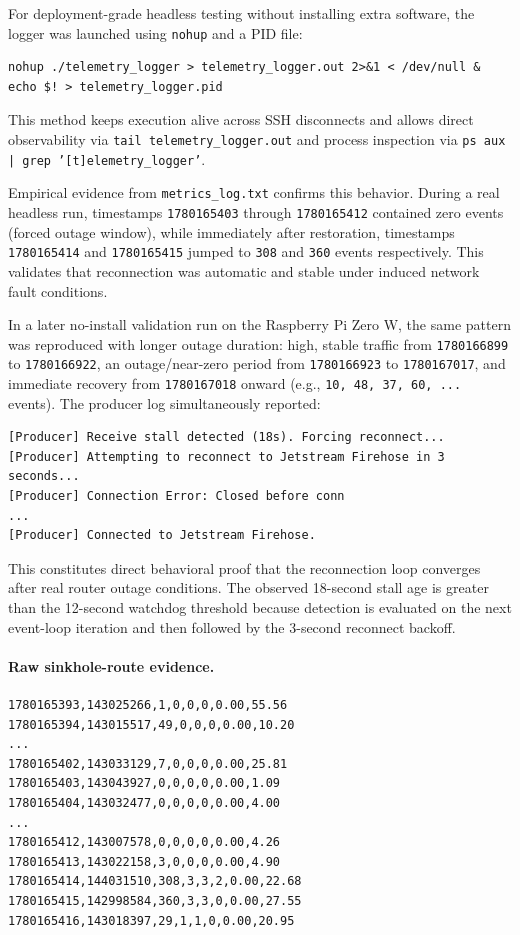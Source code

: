 \documentclass[12pt,a4paper]{article}
\begin{document}
For deployment-grade headless testing without installing extra software, the logger was launched using \texttt{nohup} and a PID file:
\begin{verbatim}
nohup ./telemetry_logger > telemetry_logger.out 2>&1 < /dev/null &
echo $! > telemetry_logger.pid
\end{verbatim}
This method keeps execution alive across SSH disconnects and allows direct observability via \texttt{tail telemetry\_logger.out} and process inspection via \texttt{ps aux | grep '[t]elemetry\_logger'}.

Empirical evidence from \texttt{metrics\_log.txt} confirms this behavior. During a real headless run, timestamps \texttt{1780165403} through \texttt{1780165412} contained zero events (forced outage window), while immediately after restoration, timestamps \texttt{1780165414} and \texttt{1780165415} jumped to \texttt{308} and \texttt{360} events respectively. This validates that reconnection was automatic and stable under induced network fault conditions.

In a later no-install validation run on the Raspberry Pi Zero W, the same pattern was reproduced with longer outage duration: high, stable traffic from \texttt{1780166899} to \texttt{1780166922}, an outage/near-zero period from \texttt{1780166923} to \texttt{1780167017}, and immediate recovery from \texttt{1780167018} onward (e.g., \texttt{10, 48, 37, 60, ...} events). The producer log simultaneously reported:
\begin{verbatim}
[Producer] Receive stall detected (18s). Forcing reconnect...
[Producer] Attempting to reconnect to Jetstream Firehose in 3 seconds...
[Producer] Connection Error: Closed before conn
...
[Producer] Connected to Jetstream Firehose.
\end{verbatim}
This constitutes direct behavioral proof that the reconnection loop converges after real router outage conditions. The observed 18-second stall age is greater than the 12-second watchdog threshold because detection is evaluated on the next event-loop iteration and then followed by the 3-second reconnect backoff.

\paragraph{Raw sinkhole-route evidence.}
\begin{verbatim}
1780165393,143025266,1,0,0,0,0.00,55.56
1780165394,143015517,49,0,0,0,0.00,10.20
...
1780165402,143033129,7,0,0,0,0.00,25.81
1780165403,143043927,0,0,0,0,0.00,1.09
1780165404,143032477,0,0,0,0,0.00,4.00
...
1780165412,143007578,0,0,0,0,0.00,4.26
1780165413,143022158,3,0,0,0,0.00,4.90
1780165414,144031510,308,3,3,2,0.00,22.68
1780165415,142998584,360,3,3,0,0.00,27.55
1780165416,143018397,29,1,1,0,0.00,20.95
\end{verbatim}
\end{document}
